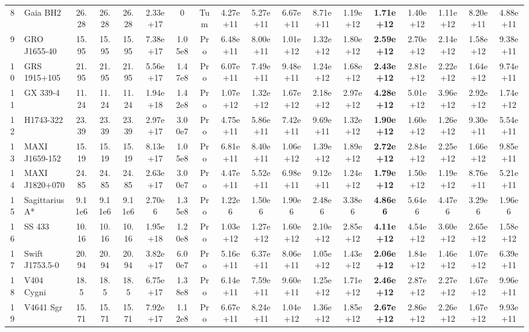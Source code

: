 \documentclass[11pt, a4paper]{article}
\begin{document}
\begin{landscape}
\begin{table}[htbp]
{\begin{tabular}{c l c c c c c c c c c c c c c c c c}
        8 & Gaia BH2 & 26.28 & 26.28 & 26.28 & 2.33e+17 & 0 & Tum & 4.27e+11 & 5.27e+11 & 6.67e+11 & 8.71e+11 & 1.19e+12 & \textbf{1.71e+12} & 1.40e+12 & 1.11e+12 & 8.20e+11 & 4.88e+11 \\
        9 & GRO J1655-40 & 15.95 & 15.95 & 15.95 & 7.38e+17 & 1.05e8 & Pro & 6.48e+11 & 8.00e+11 & 1.01e+12 & 1.32e+12 & 1.80e+12 & \textbf{2.59e+12} & 2.70e+12 & 2.14e+12 & 1.58e+12 & 9.38e+11 \\
        10 & GRS 1915+105 & 21.95 & 21.95 & 21.95 & 5.56e+17 & 1.47e8 & Pro & 6.07e+11 & 7.49e+11 & 9.48e+11 & 1.24e+12 & 1.68e+12 & \textbf{2.43e+12} & 2.81e+12 & 2.22e+12 & 1.64e+12 & 9.74e+11 \\
        11 & GX 339-4 & 11.24 & 11.24 & 11.24 & 1.94e+18 & 1.42e8 & Pro & 1.07e+12 & 1.32e+12 & 1.67e+12 & 2.18e+12 & 2.97e+12 & \textbf{4.28e+12} & 5.01e+12 & 3.96e+12 & 2.92e+12 & 1.74e+12 \\
        12 & H1743-322 & 23.39 & 23.39 & 23.39 & 2.97e+17 & 3.00e7 & Pro & 4.75e+11 & 5.86e+11 & 7.42e+11 & 9.69e+11 & 1.32e+12 & \textbf{1.90e+12} & 1.60e+12 & 1.26e+12 & 9.30e+11 & 5.54e+11 \\
        13 & MAXI J1659-152 & 15.19 & 15.19 & 15.19 & 8.13e+17 & 1.05e8 & Pro & 6.81e+11 & 8.40e+11 & 1.06e+12 & 1.39e+12 & 1.89e+12 & \textbf{2.72e+12} & 2.84e+12 & 2.25e+12 & 1.66e+12 & 9.85e+11 \\
        14 & MAXI J1820+070 & 24.85 & 24.85 & 24.85 & 2.63e+17 & 3.00e7 & Pro & 4.47e+11 & 5.52e+11 & 6.98e+11 & 9.12e+11 & 1.24e+12 & \textbf{1.79e+12} & 1.50e+12 & 1.19e+12 & 8.76e+11 & 5.21e+11 \\
        15 & Sagittarius A* & 9.11e6 & 9.11e6 & 9.11e6 & 2.70e6 & 1.35e8 & Pro & 1.22e6 & 1.50e6 & 1.90e6 & 2.48e6 & 3.38e6 & \textbf{4.86e6} & 5.64e6 & 4.47e6 & 3.29e6 & 1.96e6 \\
        16 & SS 433 & 10.16 & 10.16 & 10.16 & 1.95e+18 & 1.20e8 & Pro & 1.03e+12 & 1.27e+12 & 1.60e+12 & 2.10e+12 & 2.85e+12 & \textbf{4.11e+12} & 4.54e+12 & 3.60e+12 & 2.65e+12 & 1.58e+12 \\
        17 & Swift J1753.5-0 & 20.94 & 20.94 & 20.94 & 3.82e+17 & 6.00e7 & Pro & 5.16e+11 & 6.37e+11 & 8.06e+11 & 1.05e+12 & 1.43e+12 & \textbf{2.06e+12} & 1.84e+12 & 1.46e+12 & 1.07e+12 & 6.39e+11 \\
        18 & V404 Cygni & 18.5 & 18.5 & 18.5 & 6.75e+17 & 1.38e8 & Pro & 6.14e+11 & 7.59e+11 & 9.60e+11 & 1.25e+12 & 1.71e+12 & \textbf{2.46e+12} & 2.87e+12 & 2.27e+12 & 1.67e+12 & 9.96e+11 \\
        19 & V4641 Sgr & 15.71 & 15.71 & 15.71 & 7.92e+17 & 1.12e8 & Pro & 6.67e+11 & 8.24e+11 & 1.04e+12 & 1.36e+12 & 1.85e+12 & \textbf{2.67e+12} & 2.86e+12 & 2.26e+12 & 1.67e+12 & 9.93e+11 \\

\end{tabular}}
\end{table}
\end{landscape}
\end{document}
